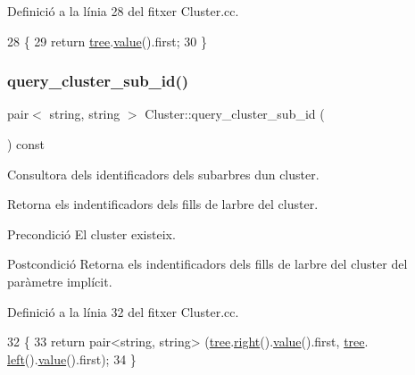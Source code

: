 Definició a la línia 28 del fitxer Cluster.\+cc.


\begin{DoxyCode}
28                                        \{
29     \textcolor{keywordflow}{return} \hyperlink{class_cluster_a3bfc63bfed216dd410ec687fe533c34c}{tree}.\hyperlink{class_bin_tree_a734e785b089c87b49187ee7c58edf5f3}{value}().first;
30 \}
\end{DoxyCode}
\mbox{\label{class_cluster_ae8c8a1d94203dccfd6fbbc5389a1e0ec}} 
\subsubsection{\texorpdfstring{query\+\_\+cluster\+\_\+sub\+\_\+id()}{query\_cluster\_sub\_id()}}
{\footnotesize\ttfamily pair$<$ string, string $>$ Cluster\+::query\+\_\+cluster\+\_\+sub\+\_\+id (\begin{DoxyParamCaption}{ }\end{DoxyParamCaption}) const}



Consultora dels identificadors dels subarbres d\textquotesingle{}un cluster. 

Retorna els indentificadors dels fills de l\textquotesingle{}arbre del cluster.

\begin{DoxyPrecond}{Precondició}
El cluster existeix. 
\end{DoxyPrecond}
\begin{DoxyPostcond}{Postcondició}
Retorna els indentificadors dels fills de l\textquotesingle{}arbre del cluster del paràmetre implícit. 
\end{DoxyPostcond}


Definició a la línia 32 del fitxer Cluster.\+cc.


\begin{DoxyCode}
32                                                          \{
33     \textcolor{keywordflow}{return} pair<string, string> (\hyperlink{class_cluster_a3bfc63bfed216dd410ec687fe533c34c}{tree}.\hyperlink{class_bin_tree_aff8e96651b27284c329667b5ad3e4d0b}{right}().\hyperlink{class_bin_tree_a734e785b089c87b49187ee7c58edf5f3}{value}().first, \hyperlink{class_cluster_a3bfc63bfed216dd410ec687fe533c34c}{tree}.
      \hyperlink{class_bin_tree_a82108db4c1b08d1f111027788c196d4e}{left}().\hyperlink{class_bin_tree_a734e785b089c87b49187ee7c58edf5f3}{value}().first);
34 \}
\end{DoxyCode}
\mbox{\label{class_cluster_ad4607d22299a7b2b2cc271300166da47}} 
